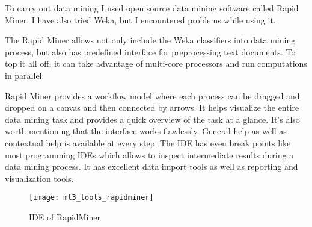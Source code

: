 
    To carry out data mining I used open source data mining software called Rapid Miner. I have also tried Weka, but I encountered problems while using it. 
    
    The Rapid Miner allows not only include the Weka classifiers into data mining process, but also has predefined interface for preprocessing text documents.
To top it all off, it can take advantage of multi-core processors and run computations in parallel.

Rapid Miner provides a workflow model where each process can be dragged and dropped on a canvas and then connected by arrows. It helps visualize the entire data mining task and provides a quick overview of the task at a glance. It's also worth mentioning that the interface works flawlessly. General help as well as contextual help is available at every step. The IDE has even break points like most programming IDEs which allows to inspect intermediate results during a data mining process. It has excellent data import tools as well as reporting and visualization tools.

\begin{figure}
\texttt{[image: ml3\_tools\_rapidminer]}
\caption{IDE of RapidMiner} 
\end{figure}
